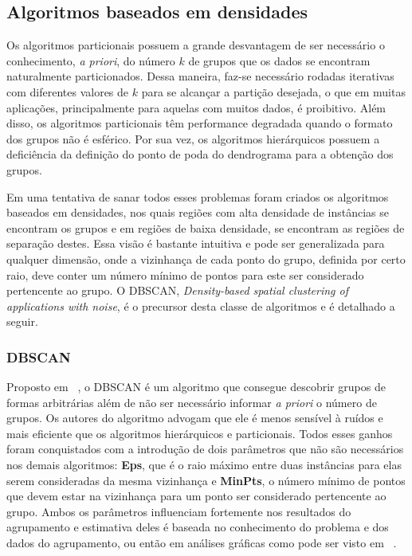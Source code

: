 \subsection{Algoritmos baseados em densidades}

Os algoritmos particionais possuem a grande desvantagem de ser necessário o conhecimento, \emph{a priori}, do número $k$ de grupos que os dados se encontram naturalmente particionados. Dessa maneira, faz-se necessário rodadas iterativas com diferentes valores de $k$ para se alcançar a partição desejada, o que em muitas aplicações, principalmente para aquelas com muitos dados, é proibitivo. Além disso, os algoritmos particionais têm performance degradada quando o formato dos grupos não é esférico. Por sua vez, os algoritmos hierárquicos possuem a deficiência da definição do ponto de poda do dendrograma para a obtenção dos grupos.

Em uma tentativa de sanar todos esses problemas foram criados os algoritmos baseados em densidades, nos quais regiões com alta densidade de instâncias se encontram os grupos e em regiões de baixa densidade, se encontram as regiões de separação destes. Essa visão é bastante intuitiva e pode ser generalizada para qualquer dimensão, onde a vizinhança de cada ponto do grupo, definida por certo raio, deve conter um número mínimo de pontos para este ser considerado pertencente ao grupo. O DBSCAN, \emph{Density-based spatial clustering of applications with noise}, é o precursor desta classe de algoritmos e é detalhado a seguir.

\subsubsection{DBSCAN} \label{sec:dbscan}

Proposto em ~\parencite{DBSCAN}, o DBSCAN é um algoritmo que consegue descobrir grupos de formas arbitrárias além de não ser necessário informar \emph{a priori} o número de grupos. Os autores do algoritmo advogam que ele é menos sensível à ruídos e mais eficiente que os algoritmos hierárquicos e particionais. Todos esses ganhos foram conquistados com a introdução de dois parâmetros que não são necessários nos demais algoritmos: \textbf{Eps}, que é o raio máximo entre duas instâncias para elas serem consideradas da mesma vizinhança e \textbf{MinPts}, o número mínimo de pontos que devem estar na vizinhança para um ponto ser considerado pertencente ao grupo. Ambos os parâmetros influenciam fortemente nos resultados do agrupamento e estimativa deles é baseada no conhecimento do problema e dos dados do agrupamento, ou então em análises gráficas como pode ser visto em ~\parencite{DBSCAN}.

